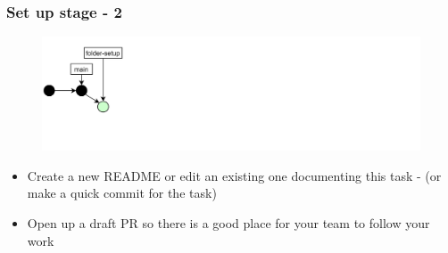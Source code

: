 \documentclass[aspectratio=169]{beamer} %
\begin{document}
\begin{frame}
	\frametitle{Set up stage - 2}
	
	\vspace{-.5cm}
	\begin{minipage}[t][5cm][t]{\textwidth}
		\begin{figure}
			\centering
			\includegraphics[width=\textwidth]{./img/dime-gitflow-network-1-1.png}
		\end{figure}
	\end{minipage}  
	
	\vspace{-.5cm}
	\begin{minipage}[t][5cm][t]{\textwidth}
		\begin{itemize}
			\setlength\itemsep{.5em}
			\item Create a new README or edit an existing one documenting this task - (or make a quick commit for the task)
			\item Open up a draft PR so there is a good place for your team to follow your work
		\end{itemize}
	\end{minipage}  
	
\end{frame}
\end{document}
